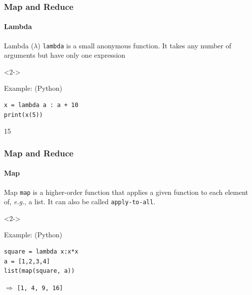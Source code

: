 \documentclass[aspectratio=169,dvipsnames]{beamer}
\begin{document}
    \begin{frame}[fragile]
        \frametitle{Map and Reduce}
        \framesubtitle{Lambda}

            \begin{block}{Lambda ($\lambda$)}
                \texttt{lambda} is a small anonymous function. It takes any number of arguments but have only one expression
            \end{block}
            \begin{uncoverenv}<2->
            \begin{block}{Example: \hfill \small(Python)}
            \begin{center}
            \begin{minipage}{0.8\linewidth}
            \begin{lstlisting}
x = lambda a : a + 10
print(x(5))
            \end{lstlisting}
            {\small 15 \\}
            \end{minipage}
            \end{center}
            \end{block}
            \end{uncoverenv}
        
    \end{frame}

    \begin{frame}[fragile]
        \frametitle{Map and Reduce}
        \framesubtitle{Map}

            \begin{block}{Map}
                \texttt{map} is a higher-order function that applies a given
                function to each element of, \textit{e.g.}, a list. It can also
                be called \texttt{apply-to-all}.
            \end{block}
            \begin{uncoverenv}<2->
            \begin{block}{Example: \hfill \small(Python)}
            \begin{center}
            \begin{minipage}{0.8\linewidth}
            \begin{lstlisting}
square = lambda x:x*x
a = [1,2,3,4]
list(map(square, a))
            \end{lstlisting}
            $\Rightarrow$ \texttt{[1, 4, 9, 16]}
            \end{minipage}
            \end{center}
            \end{block}
            \end{uncoverenv}
        
    \end{frame}
    
\end{document}
